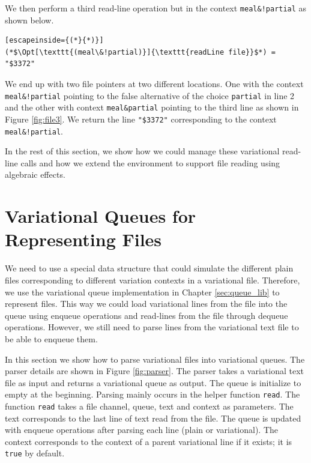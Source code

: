 We then perform a third read-line operation but in the context \texttt{meal\&!partial} as shown below.
%
\begin{lstlisting}[escapeinside={(*}{*)}]
(*$\Opt[\texttt{(meal\&!partial)}]{\texttt{readLine file}}$*) = "$3372"
\end{lstlisting}
%
We end up with two file pointers at two different locations. One with the context \texttt{meal\&!partial} pointing to the false alternative of the choice \texttt{partial} in line 2 and the other with context \texttt{meal\&partial} pointing to the third line as shown in Figure \ref{fig:file3}. We return the line \texttt{"\$3372"} corresponding to the context \texttt{meal\&!partial}. 

In the rest of this section, we show how we could manage these variational read-line calls and how we extend the environment to support file reading using algebraic effects. 

\section{Variational Queues for Representing Files}
\label{sec:queue_to_file}

We need to use a special data structure that could simulate the different plain files corresponding to different variation contexts in a variational file. Therefore, we use the variational queue implementation in Chapter \ref{sec:queue_lib} to represent files. This way we could load variational lines from the file into the queue using enqueue operations and read-lines from the file through dequeue operations. However, we still need to parse lines from the variational text file to be able to enqueue them.

In this section we show how to parse variational files into variational queues. The parser details are shown in Figure \ref{fig:parser}. The parser takes a variational text file as input and returns a variational queue as output. The queue is initialize to empty at the beginning. Parsing mainly occurs in the helper function \texttt{read}. The function \texttt{read} takes a file channel, queue, text and context as parameters. The text corresponds to the last line of text read from the file. The queue is updated with enqueue operations after parsing each line (plain or variational). The context corresponds to the context of a parent variational line if it exists; it is \texttt{true} by default.

